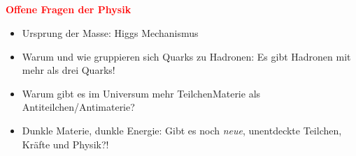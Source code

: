 \subsection{}
\begin{frame}

\textbf{\textcolor{red}{Offene Fragen der Physik}}
    \begin{itemize}
         \item [\ding{73}] Ursprung der Masse: Higgs Mechanismus
            \item [\ding{73}] Warum und wie gruppieren sich Quarks zu Hadronen: Es gibt Hadronen mit mehr als drei Quarks!
            \item [\ding{73}] Warum gibt es im Universum mehr TeilchenMaterie als Antiteilchen/Antimaterie?
            \item [\ding{73}] Dunkle Materie, dunkle Energie: Gibt es noch \emph{neue}, unentdeckte Teilchen, Kräfte und Physik?!
    \end{itemize}

\end{frame}
